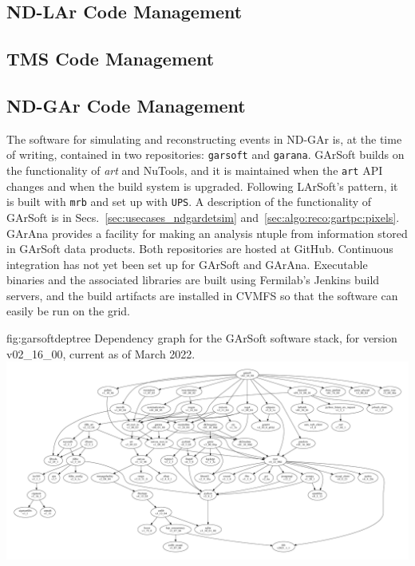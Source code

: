 \documentclass[../main-v1.tex]{subfiles}
\begin{document}
\subsection{ND-LAr Code Management}
\label{sec:codemgmt:ndlar}

\subsection{TMS Code Management}
\label{sec:codemgmt:tms}

\subsection{ND-GAr Code Management}
\label{sec:codemgmt:ndgar}

The software for simulating and reconstructing events in ND-GAr is, at the time of writing, contained in two repositories:  {\tt garsoft} and {\tt garana}.  GArSoft builds on the functionality of {\it art} and NuTools, and it is maintained when the {\tt art} API changes and when the build system is upgraded.  Following LArSoft's pattern, it is built with {\tt mrb} and set up with {\tt UPS}.   A description of the functionality of GArSoft is in Secs.~\ref{sec:usecases_ndgardetsim} and~\ref{sec:algo:reco:gartpc:pixels}.  GArAna provides a facility for making an analysis ntuple from information stored in GArSoft data products.  Both repositories are hosted at GitHub.  Continuous integration has not yet been set up for GArSoft and GArAna.  Executable binaries and the associated libraries are built using Fermilab's Jenkins build servers, and the build artifacts are installed in CVMFS so that the software can easily be run on the grid.

\begin{dunefigure}
{fig:garsoftdeptree}
{Dependency graph for the GArSoft software stack, for version v02\_16\_00, current as of March 2022.}
\includegraphics[width=\textwidth]{graphics/CodeManagementFigures/garsoft_v02_16_00_graph.pdf}
\end{dunefigure}
\end{document}
